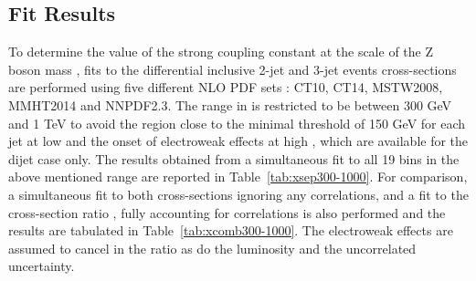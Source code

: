 \subsection{Fit Results}
To determine the value of the strong coupling constant at the scale of the Z boson mass \alpsmz, fits to the differential inclusive 2-jet and 3-jet events cross-sections are performed using five different NLO PDF sets : CT10, CT14, MSTW2008, MMHT2014 and NNPDF2.3. The range in \httwo is restricted to be between 300 GeV and 1 TeV to avoid the region close to the minimal \pt threshold of 150 GeV for each jet at low \pt and the onset of electroweak effects at high \httwo, which are available for the dijet case only. The \alpsmz results obtained from a simultaneous fit to all 19 \httwo bins in the above mentioned range are reported in Table~\ref{tab:xsep300-1000}. For comparison, a simultaneous fit to both cross-sections ignoring any correlations, and a fit to the cross-section ratio \ratio, fully accounting for correlations is also performed and the results are tabulated in Table~\ref{tab:xcomb300-1000}. The electroweak effects are assumed to cancel in the ratio as do the luminosity and the uncorrelated uncertainty.

